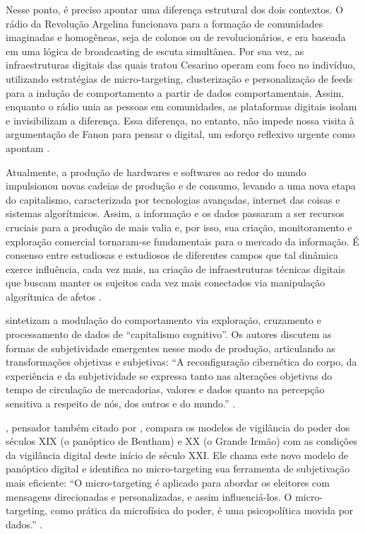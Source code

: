 \documentclass[portuguese]{textolivre}
\begin{document}
Nesse ponto, é preciso apontar uma diferença estrutural dos dois contextos. O rádio da Revolução Argelina funcionava para a formação de comunidades imaginadas e homogêneas, seja de colonos ou de revolucionários, e era baseada em uma lógica de broadcasting de escuta simultânea. Por sua vez, as infraestruturas digitais das quais tratou Cesarino operam com foco no indivíduo, utilizando estratégias de micro-targeting, clusterização e personalização de feeds para a indução de comportamento a partir de dados comportamentais. Assim, enquanto o rádio unia as pessoas em comunidades, as plataformas digitais isolam e invisibilizam a diferença.  Essa diferença, no entanto, não impede nossa visita à argumentação de Fanon para pensar o digital, um esforço reflexivo urgente como apontam \textcite{faustino2023colonialismo}.

Atualmente, a produção de hardwares e softwares ao redor do mundo impulsionou novas cadeias de produção e de consumo, levando a uma nova etapa do capitalismo, caracterizada por tecnologias avançadas, internet das coisas e sistemas algorítmicos. Assim, a informação e os dados passaram a ser recursos cruciais para a produção de mais valia e, por isso, sua criação, monitoramento e exploração comercial tornaram-se fundamentais para o mercado da informação. É consenso entre estudiosas e estudiosos de diferentes campos que tal dinâmica exerce influência, cada vez mais, na criação de infraestruturas técnicas digitais que buscam manter os sujeitos cada vez mais conectados via manipulação algorítmica de afetos \cite{cesarino2021b,faustino2023colonialismo,han2023psicopolitica}.

\textcite[p. 154]{faustino2023colonialismo} sintetizam a modulação do comportamento via exploração, cruzamento e processamento de dados de “capitalismo cognitivo”. Os autores discutem as formas de subjetividade emergentes nesse modo de produção, articulando as transformações objetivas e subjetivas: “A reconfiguração cibernética do corpo, da experiência e da subjetividade se expressa tanto nas alterações objetivas do tempo de circulação de mercadorias, valores e dados quanto na percepção sensitiva a respeito de nós, dos outros e do mundo.” \cite[p. 155]{faustino2023colonialismo}.

\textcite{han2023psicopolitica}, pensador também citado por \textcite{faustino2023colonialismo}, compara os modelos de vigilância do poder dos séculos XIX (o panóptico de Bentham) e XX (o Grande Irmão) com as condições da vigilância digital deste início de século XXI. Ele chama este novo modelo de panóptico digital e identifica no micro-targeting sua ferramenta de subjetivação mais eficiente: “O micro-targeting é aplicado para abordar os eleitores com mensagens direcionadas e personalizadas, e assim influenciá-los. O micro-targeting, como prática da microfísica do poder, é uma psicopolítica movida por dados.” \cite[p. 72]{han2023psicopolitica}.
\end{document}
